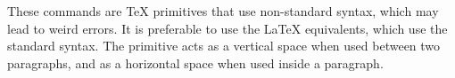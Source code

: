 These commands are \TeX{} primitives that use non-standard syntax, which may
lead to weird errors. It is preferable to use the \LaTeX{} equivalents, which
use the standard syntax. The  primitive acts as a vertical space when used between two paragraphs, and as a horizontal space when used inside a paragraph.
\begin{chktexignore}  
\chto|\vskip 1cm||\vspace{1cm}|
\chto|\mskip 1mu||\mspace{1mu}|
\end{chktexignore}

\endgroup
